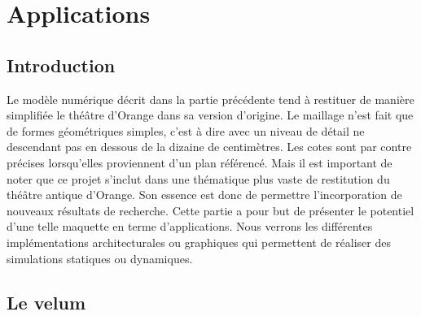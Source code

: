 		
		
		
		
		
		
		
		
		
		
		
\chapter{Applications}
	\minitoc
	\newpage

\section*{Introduction}
Le modèle numérique décrit dans la partie précédente tend à restituer de manière simplifiée le théâtre d'Orange dans sa version d'origine. Le maillage n'est fait que de formes géométriques simples, c'est à dire avec un niveau de détail ne descendant pas en dessous de la dizaine de centimètres. Les cotes sont par contre précises lorsqu'elles proviennent d'un plan référencé. Mais il est important de noter que ce projet s'inclut dans une thématique plus vaste de restitution du théâtre antique d'Orange. Son essence est donc de permettre l'incorporation de nouveaux résultats de recherche. Cette partie a pour but de présenter le potentiel d'une telle maquette en terme d'applications. Nous verrons les différentes implémentations architecturales ou graphiques qui permettent de réaliser des simulations statiques ou dynamiques.

\section{Le \gls{velum}} \label{sect_velum}

